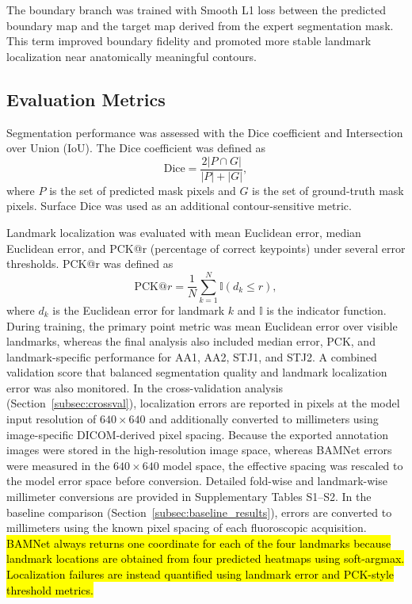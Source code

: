 \documentclass[utf8]{FrontiersinHarvard}
\begin{document}
The boundary branch was trained with Smooth L1 loss between the predicted boundary map and the target map derived from the expert segmentation mask. 
This term improved boundary fidelity and promoted more stable landmark localization near anatomically meaningful contours.

\subsection{Evaluation Metrics}

Segmentation performance was assessed with the Dice coefficient and Intersection over Union (IoU). The Dice coefficient was defined as
\begin{equation}
\mathrm{Dice} = \frac{2|P \cap G|}{|P| + |G|},
\end{equation}
where $P$ is the set of predicted mask pixels and $G$ is the set of ground-truth mask pixels. Surface Dice was used as an additional contour-sensitive metric.

Landmark localization was evaluated with mean Euclidean error, median Euclidean error, and PCK@r (percentage of correct keypoints) under several error 
thresholds. PCK@r was defined as
\begin{equation}
\mathrm{PCK}@r = \frac{1}{N}\sum_{k=1}^{N}\mathbb{I}(d_k \leq r),
\end{equation}
where $d_k$ is the Euclidean error for landmark $k$ and $\mathbb{I}$ is the indicator function. During training, the primary point metric was mean 
Euclidean error over visible landmarks, whereas the final analysis also included median error, PCK, and landmark-specific performance for AA1, AA2, 
STJ1, and STJ2. A combined validation score that balanced segmentation quality and landmark localization error was also monitored. In the
cross-validation analysis (Section~\ref{subsec:crossval}), localization errors are reported in pixels at the model input resolution of
$640 \times 640$ and additionally converted to millimeters using image-specific DICOM-derived pixel spacing. Because the exported 
annotation images were stored in the high-resolution image space, whereas BAMNet errors were measured in the $640 \times 640$ model space, 
the effective spacing was rescaled to the model error space before conversion. Detailed fold-wise and landmark-wise millimeter conversions 
are provided in Supplementary Tables S1--S2. In the baseline comparison (Section~\ref{subsec:baseline_results}), errors are converted to 
millimeters using the known pixel spacing of each fluoroscopic acquisition. \hl{BAMNet always returns one coordinate for each of the four landmarks 
because landmark locations are obtained from four predicted heatmaps using soft-argmax. Localization failures are instead quantified using landmark 
error and PCK-style threshold metrics.}
\end{document}
